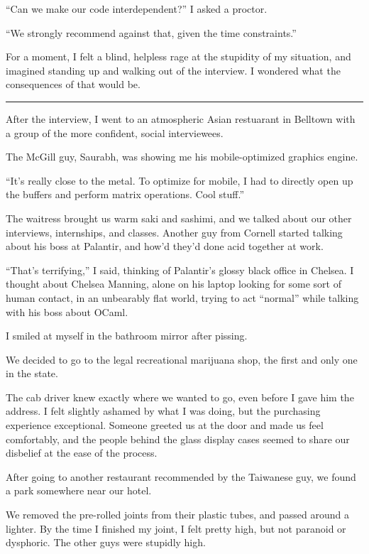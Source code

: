 ``Can we make our code interdependent?'' I asked a proctor.

``We strongly recommend against that, given the time constraints.''

For a moment, I felt a blind, helpless rage at the stupidity of my situation,
and imagined standing up and walking out of the interview.  I wondered what the
consequences of that would be.  

\plainfancybreak{12pt}{2}{* * *}

After the interview, I went to an atmospheric Asian restuarant in Belltown with
a group of the more confident, social interviewees.  

The McGill guy, Saurabh, was showing me his mobile-optimized graphics engine.

``It's really close to the metal.  To optimize for mobile, I had to directly
open up the buffers and perform matrix operations.  Cool stuff.''

The waitress brought us warm saki and sashimi, and we talked about our other
interviews, internships, and classes.  Another guy from Cornell started talking
about his boss at Palantir, and how'd they'd done acid together at work.

``That's terrifying,'' I said, thinking of Palantir's glossy black office in
Chelsea.  I thought about Chelsea Manning, alone on his laptop looking for some
sort of human contact, in an unbearably flat world, trying to act ``normal''
while talking with his boss about OCaml.

I smiled at myself in the bathroom mirror after pissing.

We decided to go to the legal recreational marijuana shop, the first and only
one in the state. 

The cab driver knew exactly where we wanted to go, even before I gave him the
address.  I felt slightly ashamed by what I was doing, but the purchasing
experience exceptional.  Someone greeted us at the door and made us feel
comfortably, and the people behind the glass display cases seemed to share our
disbelief at the ease of the process.

After going to another restaurant recommended by the Taiwanese guy, we found a
park somewhere near our hotel.

We removed the pre-rolled joints from their plastic tubes, and passed around a
lighter.  By the time I finished my joint, I felt pretty high, but not paranoid
or dysphoric.  The other guys were stupidly high.

